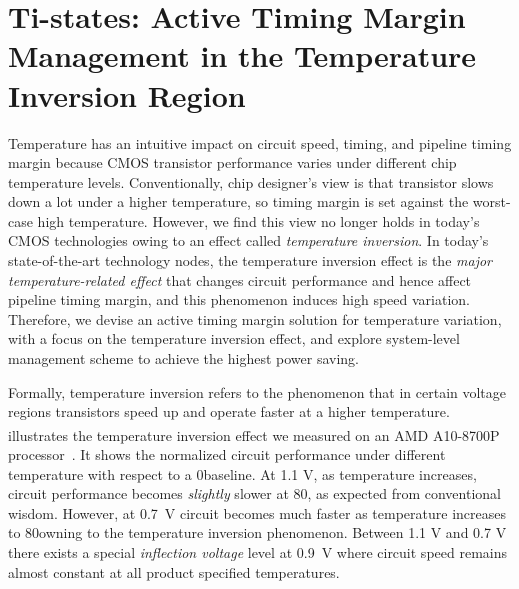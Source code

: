 
\chapter{Ti-states: Active Timing Margin Management in the Temperature Inversion Region}
\label{sec:temperature}

Temperature has an intuitive impact on circuit speed, timing, and pipeline timing margin because CMOS transistor performance varies under different chip temperature levels. Conventionally, chip designer's view is that transistor slows down a lot under a higher temperature, so timing margin is set against the worst-case high temperature. However, we find this view no longer holds in today's CMOS technologies owing to an effect called \textit{temperature inversion}. In today's state-of-the-art technology nodes, the temperature inversion effect is the \textit{major temperature-related effect} that changes circuit performance and hence affect pipeline timing margin, and this phenomenon induces high speed variation. Therefore, we devise an active timing margin solution for temperature variation, with a focus on the temperature inversion effect, and explore system-level management scheme to achieve the highest power saving.

Formally, temperature inversion refers to the phenomenon that in certain voltage regions transistors speed up and operate faster at a higher temperature.  illustrates the temperature inversion effect we measured on an AMD\textsuperscript{\textregistered} A10-8700P processor~\cite{munger2016carrizo}. It shows the normalized circuit performance under different temperature with respect to a 0\C baseline. At 1.1 V, as temperature increases, circuit performance becomes \textit{slightly} slower at 80\C, as expected from conventional wisdom. However, at 0.7~V circuit becomes much faster as temperature increases to 80\C owning to the temperature inversion phenomenon. Between 1.1 V and 0.7 V there exists a special {\it inflection voltage} level at 0.9~V where circuit speed remains almost constant at all product specified temperatures. 

